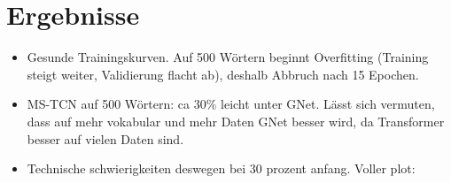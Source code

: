 \documentclass[11pt,a4paper]{article}
\begin{document}
\section{Ergebnisse}
\begin{itemize}
  \item Gesunde Trainingskurven. Auf 500 Wörtern beginnt Overfitting (Training steigt weiter,
        Validierung flacht ab), deshalb Abbruch nach 15 Epochen.
  \item MS-TCN auf 500 Wörtern: ca 30\% leicht unter GNet. Lässt sich vermuten, dass auf mehr vokabular und mehr Daten GNet besser wird, da Transformer besser auf vielen Daten sind.
  \item Technische schwierigkeiten deswegen bei 30 prozent anfang. Voller plot:


\end{itemize}
\end{document}
